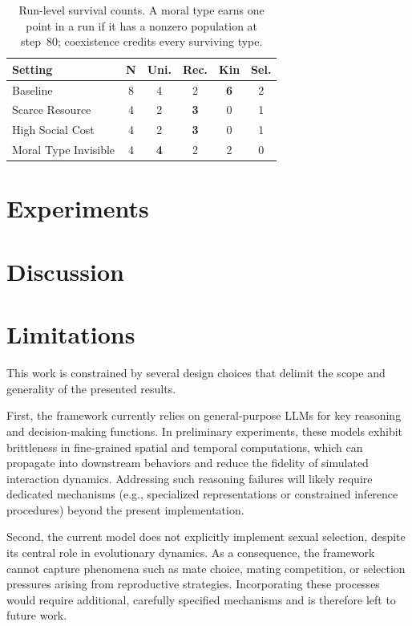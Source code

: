 \documentclass[11pt]{article}
\begin{document}
\begin{table}[t!]
\centering
\small
\begin{tabular}{l c c c c c}
\toprule
\textbf{Setting} & \textbf{N} & \textbf{Uni.} & \textbf{Rec.} & \textbf{Kin} & \textbf{Sel.} \\
\midrule
Baseline              & 8 & 4 & 2 & \textbf{6} & 2 \\
Scarce Resource       & 4 & 2 & \textbf{3} & 0 & 1 \\
High Social Cost      & 4 & 2 & \textbf{3} & 0 & 1 \\
Moral Type Invisible  & 4 & \textbf{4} & 2 & 2 & 0 \\
\bottomrule
\end{tabular}
\caption{Run-level survival counts. A moral type earns one point in a run if it has a nonzero population at step~80; coexistence credits every surviving type.}
\label{tab:replicate_outcomes_main}
\end{table}

\section{Experiments}
\label{sec:experiments}


\section{Discussion}
\label{sec:discussion}



\section*{Limitations}

This work is constrained by several design choices that delimit the scope and generality of the presented results. 

First, the framework currently relies on general-purpose LLMs for key reasoning and decision-making functions. In preliminary experiments, these models exhibit brittleness in fine-grained spatial and temporal computations, which can propagate into downstream behaviors and reduce the fidelity of simulated interaction dynamics. Addressing such reasoning failures will likely require dedicated mechanisms (e.g., specialized representations or constrained inference procedures) beyond the present implementation.

Second, the current model does not explicitly implement sexual selection, despite its central role in evolutionary dynamics. As a consequence, the framework cannot capture phenomena such as mate choice, mating competition, or selection pressures arising from reproductive strategies. Incorporating these processes would require additional, carefully specified mechanisms and is therefore left to future work.
\end{document}
